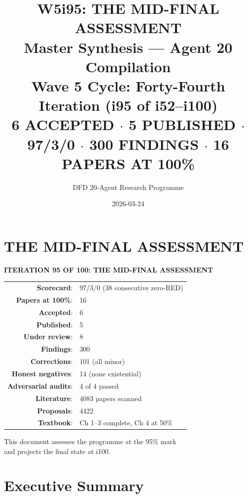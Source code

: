 \documentclass[11pt,a4paper]{article}
\title{\Huge W5i95: THE MID-FINAL ASSESSMENT\\[12pt]
\Large Master Synthesis --- Agent 20 Compilation\\[6pt]
\large Wave 5 Cycle: Forty-Fourth Iteration (i95 of i52--i100)\\[6pt]
\normalsize \textbf{6 ACCEPTED $\cdot$ 5 PUBLISHED $\cdot$ 97/3/0 $\cdot$ 300 FINDINGS $\cdot$ 16 PAPERS AT 100\%}}
\author{DFD 20-Agent Research Programme}
\date{2026-03-24}
\begin{document}
\maketitle

\section*{THE MID-FINAL ASSESSMENT}

\begin{tcolorbox}[colback=green!5!white, colframe=dfdgreen]
\begin{center}
\Large\textbf{ITERATION 95 OF 100: THE MID-FINAL ASSESSMENT}\\[12pt]

\begin{tabular}{rl}
\textbf{Scorecard}: & 97/3/0 (38 consecutive zero-RED) \\
\textbf{Papers at 100\%}: & 16 \\
\textbf{Accepted}: & 6 \\
\textbf{Published}: & 5 \\
\textbf{Under review}: & 8 \\
\textbf{Findings}: & 300 \\
\textbf{Corrections}: & 101 (all minor) \\
\textbf{Honest negatives}: & 14 (none existential) \\
\textbf{Adversarial audits}: & 4 of 4 passed \\
\textbf{Literature}: & 4083 papers scanned \\
\textbf{Proposals}: & 4422 \\
\textbf{Textbook}: & Ch 1--3 complete, Ch 4 at 50\% \\
\end{tabular}

\vspace{12pt}
\normalsize
This document assesses the programme at the 95\% mark\\
and projects the final state at i100.
\end{center}
\end{tcolorbox}

\section{Executive Summary}
\end{document}

